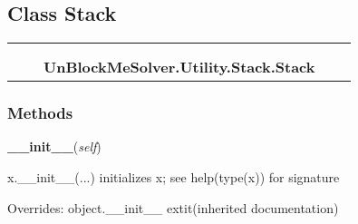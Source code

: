 \subsection{Class Stack}

    \label{UnBlockMeSolver:Utility:Stack:Stack}
\begin{tabular}{cccccc}
\multicolumn{2}{r}{\settowidth{\BCL}{object}\multirow{2}{\BCL}{object}}
&&
  \\\cline{3-3}
  &&\multicolumn{1}{c|}{}
&&
  \\
&&\multicolumn{2}{l}{\textbf{UnBlockMeSolver.Utility.Stack.Stack}}
\end{tabular}



  \subsubsection{Methods}

    \vspace{0.5ex}

\hspace{.8\funcindent}\begin{boxedminipage}{\funcwidth}

    \raggedright \textbf{\_\_init\_\_}(\textit{self})

\setlength{\parskip}{2ex}
    x.\_\_init\_\_(...) initializes x; see help(type(x)) for signature

\setlength{\parskip}{1ex}
      Overrides: object.\_\_init\_\_ 	extit{(inherited documentation)}

    \end{boxedminipage}

    \label{UnBlockMeSolver:Utility:Stack:Stack:put}

    \vspace{0.5ex}

